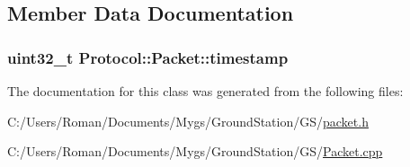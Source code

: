 \subsection{Member Data Documentation}
\hypertarget{class_protocol_1_1_packet_a2f0a19f4bff82270290e53d31e67db33}{}
\subsubsection[{timestamp}]{\setlength{\rightskip}{0pt plus 5cm}uint32\+\_\+t Protocol\+::\+Packet\+::timestamp\hspace{0.3cm}{\ttfamily [protected]}}\label{class_protocol_1_1_packet_a2f0a19f4bff82270290e53d31e67db33}


The documentation for this class was generated from the following files\+:\begin{DoxyCompactItemize}
\item 
C\+:/\+Users/\+Roman/\+Documents/\+Mygs/\+Ground\+Station/\+G\+S/\hyperlink{packet_8h}{packet.\+h}\item 
C\+:/\+Users/\+Roman/\+Documents/\+Mygs/\+Ground\+Station/\+G\+S/\hyperlink{_packet_8cpp}{Packet.\+cpp}\end{DoxyCompactItemize}
